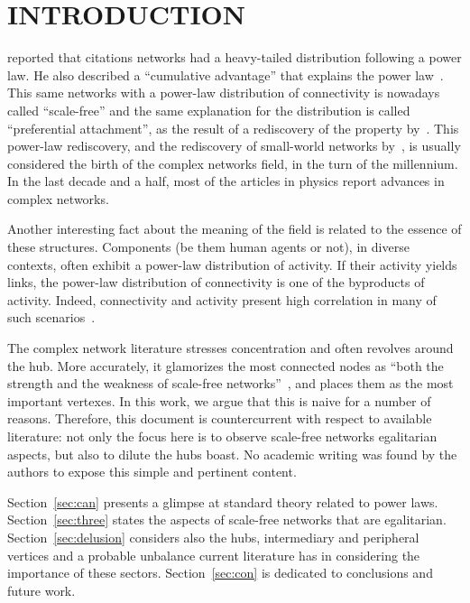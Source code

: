 \documentclass[12pt,fleqn]{article}
\begin{document}
\section{INTRODUCTION}
\cite{price1}
reported that citations networks had a heavy-tailed distribution following a power law.
He also described a ``cumulative advantage'' that explains the power law~\citep{price2}.
This same networks with a power-law distribution of connectivity is nowadays called ``scale-free''
and the same explanation for the distribution is called ``preferential attachment'',
as the result of a rediscovery of the property by~\cite{barabasi1}.
This power-law rediscovery, and the rediscovery of small-world networks by~\cite{small},
is usually considered the birth of the complex networks field,
in the turn of the millennium.
In the last decade and a half,
most of the articles in physics report advances in complex networks.

Another interesting fact about the meaning of the field
is related to the essence of these structures.
Components (be them human agents or not), in diverse contexts, often
exhibit a power-law distribution of activity.
If their activity yields links,
the power-law distribution of connectivity is one of the byproducts of activity.
Indeed, connectivity and activity present high correlation in many of such scenarios~\citep{fabbri1,fabbri2,fabbri3}.

The complex network literature stresses concentration and often revolves around the hub. 
More accurately, it glamorizes the most connected nodes as
``both the strength and the weakness of scale-free networks''~\citep{wikipedia,networks},
and places them as the most important vertexes.
In this work, we argue that this is naive for a number of reasons.
Therefore, this document is countercurrent with respect to available literature:
not only the focus here is to observe scale-free networks egalitarian aspects,
but also to dilute the hubs boast.
No academic writing was found by the authors to expose this simple and pertinent content.

Section~\ref{sec:can} presents a glimpse at standard theory related to power laws.
Section~\ref{sec:three} states the aspects of scale-free networks that are egalitarian.
Section~\ref{sec:delusion} considers also the hubs, intermediary and peripheral vertices
and a probable unbalance current literature has in considering the importance of these sectors.
Section~\ref{sec:con} is dedicated to conclusions and future work.
\end{document}
